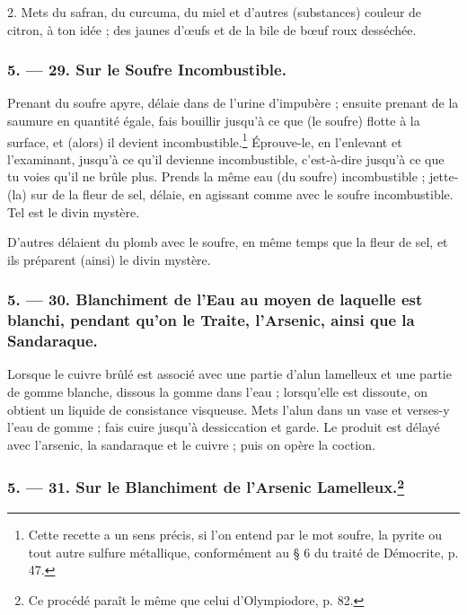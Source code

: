 \documentclass[a4paper, 11pt, oneside, polutonikogreek, french]{article}
\begin{document}
2. Mets du safran, du curcuma, du miel et d'autres (substances) couleur de citron, à ton idée ; des jaunes d'œufs et de la bile de bœuf roux desséchée.

\bigskip
\centerline{\EightStarTaper}
\centerline{\EightStarTaper\EightStarTaper}
\bigskip

\subsubsection{5. --- 29. Sur le Soufre Incombustible.}

Prenant du soufre apyre, délaie dans de l'urine d'impubère ; ensuite prenant de la saumure en quantité égale, fais bouillir jusqu'à ce que (le soufre) flotte à la surface, et (alors) il devient incombustible.\footnote{Cette recette a un sens précis, si l'on entend par le mot soufre, la pyrite ou tout autre sulfure métallique, conformément au § 6 du traité de Démocrite, p. 47.} Éprouve-le, en l'enlevant et l'examinant, jusqu'à ce qu'il devienne incombustible, c'est-à-dire jusqu'à ce que tu voies qu'il ne brûle plus. Prends la même eau (du soufre) incombustible ; jette-(la) sur de la fleur de sel, délaie, en agissant comme avec le soufre incombustible. Tel est le divin mystère.

D'autres délaient du plomb avec le soufre, en même temps que la fleur de sel, et ils préparent (ainsi) le divin mystère.

\bigskip
\centerline{\EightStarTaper}
\centerline{\EightStarTaper\EightStarTaper}
\bigskip

\subsubsection{5. --- 30. Blanchiment de l'Eau au moyen de laquelle est blanchi, pendant qu'on le Traite, l'Arsenic, ainsi que la Sandaraque.}

Lorsque le cuivre brûlé est associé avec une partie d'alun lamelleux et une partie de gomme blanche, dissous la gomme dans l'eau ; lorsqu'elle est dissoute, on obtient un liquide de consistance visqueuse. Mets l'alun dans un vase et verses-y l'eau de gomme ; fais cuire jusqu'à dessiccation et garde. Le produit est délayé avec l'arsenic, la sandaraque et le cuivre ; puis on opère la coction.

\bigskip
\centerline{\EightStarTaper}
\centerline{\EightStarTaper\EightStarTaper}
\bigskip

\subsubsection[5. --- 31. Sur le Blanchiment de l'Arsenic Lamelleux.]{5. --- 31. Sur le Blanchiment de l'Arsenic Lamelleux.\footnote{Ce procédé paraît le même que celui d'Olympiodore, p. 82.}}
\end{document}
